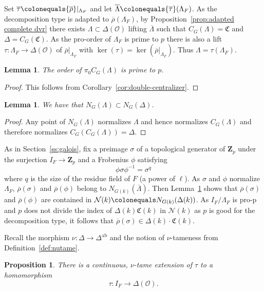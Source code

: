 \documentclass[11pt, letterpaper,english]{amsart}
\theoremstyle{plain}
\newtheorem{lemma}[lem]{Lemma}
\newtheorem{proposition}[lem]{Proposition}
\theoremstyle{definition}
\numberwithin{equation}{section}
\numberwithin{lem}{section}
\newcommand{\mathfont}{\mathbf}
\newcommand{\Z}{\mathfont Z}
\newcommand{\fC}{\mathfrak{C}}
\newcommand{\cN}{\mathcal{N}}
\newcommand{\cO}{\mathcal{O}}
\newcommand{\rhobar}{{\overline{\rho}}}
\newcommand{\taubar}{{\overline{\tau}}}
\newcommand{\ab}{\textrm{ab}}
\newcommand{\cent}[2]{C_{#1}(#2)}
\newcommand{\nlz}[2]{N_{#1}(#2)}
\newcommand{\Ld}{\Lambda}
\newcommand{\Lbar}{\overline{\Lambda}}
\newcommand{\Dt}{\Delta}
\begin{document}
Set $ \overline{\tau} \colonequals \rhobar |_{\Lambda_F}$ and let $\overline{\Ld} \colonequals  \taubar(\Ld_F)$. 
As the decomposition type is adapted to $\rhobar(\Lambda_F)$, by Proposition~\ref{prop:adapted complete dvr}
    there exists $\Lambda \subset \Delta(\cO)$ lifting $\Lbar$ 
    such that $C_G(\Lambda)= \fC$ and $\Delta = C_G(\fC)$.  As the pro-order of $\Lambda_F$ is prime to $p$ there is also
a lift $\tau : \Lambda_F \to \Delta(\cO)$ of $\rhobar|_{\Lambda_F}$ with $\ker(\tau) = \ker(\overline{\rho}|_{\Lambda_F})$. Thus $\Lambda = \tau(\Lambda_F)$.




\begin{lemma} \label{saturation}
The order of $\pi_0\cent{G}{\Lambda}$ is prime to $p$. 
\end{lemma}
\begin{proof}
This follows from Corollary~\ref{cor:double-centralizer}. 
\end{proof}

\begin{lemma} \label{lem:normalizers} 
We have that $\nlz{G}{\Lambda} \subset \nlz{G}{\Dt}$.  
\end{lemma}

\begin{proof}
Any point of $\nlz{G}{{\Lambda}}$ normalizes ${\Ld}$ and hence normalizes $\cent{G}{\Ld}$ and therefore normalizes $\cent{G}{\cent{G}{\Ld}}=\Dt$.
\end{proof}

As in Section~\ref{ss:galois}, fix a preimage $\sigma$ of a topological generator of $\Z_p$ under the surjection $I_F \to \Z_p$ and a Frobenius $\phi$ satisfying  
\[ \phi \sigma \phi^{-1}=\sigma^q \]
where $q$ is the size of the residue field of $F$ (a power of $\ell$).  
As $\sigma$ and $\phi$ normalize $\Ld_F$, $\rhobar(\sigma)$ and $\rhobar(\phi)$ belong to $\nlz{G(k)}{\overline{\Lambda}}$.
Then Lemma~\ref{lem:normalizers} shows that
$\rhobar(\sigma)$ and $\rhobar(\phi)$ are contained in $\cN(k) \colonequals \nlz{G(k)}{\Dt(k)}$.
As $I_F/\Ld_F$ is pro-p and $p$ does not divide the index of 
$\Delta(k) \fC(k)$ in $\cN(k)$ as $p$ is good for the decomposition type, it follows that $\rhobar(\sigma) \in \Dt(k) \cdot \fC(k)$.  

Recall the morphism $\nu : \Delta \to \Dt^{\ab}$ and the notion of $\nu$-tameness from Definition~\ref{def:nutame}.

\begin{proposition} \label{prop:extension R=O}
There is a continuous, $\nu$-tame extension of $\tau$ to a homomorphism
\[ \tau: I_F \to \Dt(\cO). \]
\end{proposition}
\end{document}
